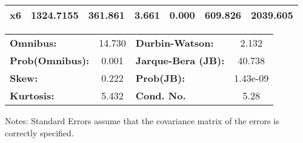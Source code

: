 \begin{center}
\begin{tabular}{lcccccc}
\textbf{x6}    &    1324.7155  &      361.861     &     3.661  &         0.000        &      609.826    &     2039.605     \\
\bottomrule
\end{tabular}
\begin{tabular}{lclc}
\textbf{Omnibus:}       & 14.730 & \textbf{  Durbin-Watson:     } &    2.132  \\
\textbf{Prob(Omnibus):} &  0.001 & \textbf{  Jarque-Bera (JB):  } &   40.738  \\
\textbf{Skew:}          &  0.222 & \textbf{  Prob(JB):          } & 1.43e-09  \\
\textbf{Kurtosis:}      &  5.432 & \textbf{  Cond. No.          } &     5.28  \\
\bottomrule
\end{tabular}
\end{center}

Notes: \newline
 [1] Standard Errors assume that the covariance matrix of the errors is correctly specified.